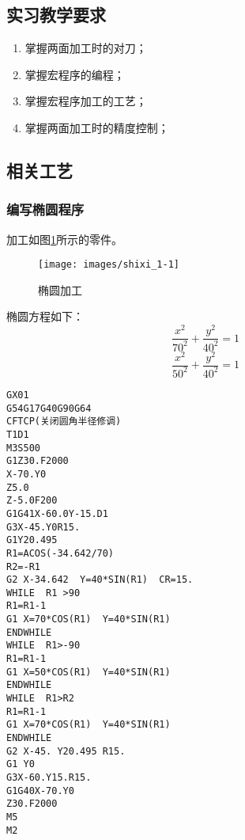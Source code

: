 \jxhj{%
	}

\makeshouye %

\subsection{实习教学要求}
\begin{enumerate}[\hspace{2em}1、]
	\item 掌握两面加工时的对刀；
	\item 掌握宏程序的编程；
	\item 掌握宏程序加工的工艺；
    \item 掌握两面加工时的精度控制；
\end{enumerate}

\subsection{相关工艺}
\subsubsection{编写椭圆程序}
加工如图\ref{椭圆加工}所示的零件。
\begin{figure}[!hbtp]
	\centering	\texttt{[image: images/shixi\_1-1]}
	\caption{椭圆加工} \label{椭圆加工}
\end{figure}

椭圆方程如下：
\[
\frac{x^2}{70^2}+\frac{y^2}{40^2}=1
\]
\[
\frac{x^2}{50^2}+\frac{y^2}{40^2}=1
\]

\begin{lstlisting}
GX01 
G54G17G40G90G64
CFTCP(关闭圆角半径修调)
T1D1
M3S500
G1Z30.F2000
X-70.Y0
Z5.0
Z-5.0F200
G1G41X-60.0Y-15.D1
G3X-45.Y0R15.
G1Y20.495
R1=ACOS(-34.642/70)
R2=-R1
G2 X-34.642  Y=40*SIN(R1)  CR=15.
WHILE  R1 >90
R1=R1-1
G1 X=70*COS(R1)  Y=40*SIN(R1)
ENDWHILE
WHILE  R1>-90
R1=R1-1
G1 X=50*COS(R1)  Y=40*SIN(R1)
ENDWHILE
WHILE  R1>R2
R1=R1-1
G1 X=70*COS(R1)  Y=40*SIN(R1)
ENDWHILE
G2 X-45. Y20.495 R15.
G1 Y0
G3X-60.Y15.R15.
G1G40X-70.Y0
Z30.F2000
M5
M2
\end{lstlisting}


